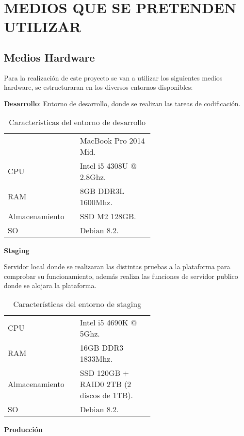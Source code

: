 \documentclass{pre-tfg}
\begin{document}
\section{MEDIOS QUE SE PRETENDEN UTILIZAR}

\subsection{Medios Hardware}

Para la realización de este proyecto se van a utilizar los siguientes medios hardware, se
estructuraran en los diversos entornos disponibles:

\textbf{Desarrollo}:
Entorno de desarrollo, donde se realizan las tareas de codificación.

\begin{table}[hp]
  \caption{Características del entorno de desarrollo}
  \centering

  \begin{tabular}{p{0.2\linewidth}p{0.4\linewidth}}
    & MacBook Pro 2014 Mid.\\
    CPU& Intel i5 4308U @ 2.8Ghz.\\
    RAM& 8GB DDR3L 1600Mhz.\\
    Almacenamiento& SSD M2 128GB.\\
    SO& Debian 8.2.\\
  \end{tabular}
\end{table}

\textbf{Staging}

Servidor local donde se realizaran las distintas pruebas a la plataforma para comprobar su
funcionamiento, además realiza las funciones de servidor publico donde se alojara la
plataforma.

\begin{table}[hp]
  \caption{Características del entorno de staging}
  \centering

  \begin{tabular}{p{0.2\linewidth}p{0.4\linewidth}}
    CPU& Intel i5 4690K @ 5Ghz.\\
    RAM& 16GB DDR3 1833Mhz.\\
    Almacenamiento& SSD 120GB + RAID0 2TB (2 discos de 1TB).\\
    SO& Debian 8.2.\\
  \end{tabular}
\end{table}

\textbf{Producción}
\end{document}
